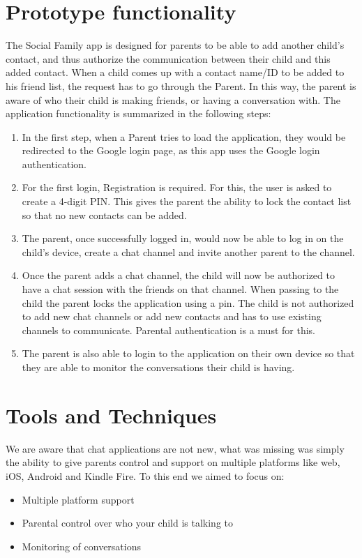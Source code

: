 \documentclass[a4paper,10pt]{article}
\begin{document}
\section{Prototype functionality}
The Social Family app is designed for parents to be able to add another child's contact, and thus authorize the communication between their child and this added contact. When a child comes up with a contact name/ID to be added to his friend list, the request has to go through the Parent. In this way, the parent is aware of who their child is making friends, or having a conversation with. The application functionality is summarized in the following steps:
\begin{enumerate}
\item In the first step, when a Parent tries to load the application, they would be redirected to the Google login page, as this app uses the Google login authentication.
\item For the first login, Registration is required. For this, the user is asked to create a 4-digit PIN. This gives the parent the ability to lock the contact list so that no new contacts can be added.
\item The parent, once successfully logged in, would now be able to log in on the child's device, create a chat channel and invite another parent to the channel.

\item Once the parent adds a chat channel, the child will now be authorized to have a chat session with the friends on that channel.  When passing to the child the parent locks the application using a pin. The child is not authorized to add new chat channels or add new contacts and has to use existing channels to communicate. Parental authentication is a must for this.

\item The parent is also able to login to the application on their own device so that they are able to monitor the conversations their child is having.

\end{enumerate}
\newpage
\section{Tools and Techniques}
We are aware that chat applications are not new, what was missing was simply the ability to give parents control and support on multiple platforms like web, iOS, Android and Kindle Fire. To this end we aimed to focus on:
\begin{itemize}
\item Multiple platform support
\item Parental control over who your child is talking to
\item Monitoring of conversations
\end{itemize}
\end{document}
